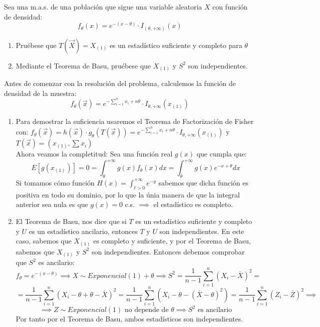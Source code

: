 \begin{problem}{2.4}
	Sea una m.a.s. de una población que sigue una variable aleatoria $X$ con función de densidad: 
	$$f_{\theta}(x) = e^{-(x - \theta)} \cdot I_{(\theta, +\infty)}(x)$$
	\begin{enumerate}
		\item Pruébese que $T(\vec{X}) = X_{(1)}$ es un estadístico suficiente y completo para $\theta$
		\item Mediante el Teorema de Basu, pruébese que $X_{(1)}$ y $S^2$ son independientes. 
	\end{enumerate} 
\end{problem}
\begin{sol}
	Antes de comenzar con la resolución del problema, calculemos la función de densidad de la muestra: 
	$$f_{\theta}(\vec{x}) = e^{-\sum_{i = 1}^{n}x_i + n\theta} \cdot I_{\theta, +\infty}(x_{(1)})$$
	\begin{enumerate}
		\item Para demostrar la suficiencia usaremos el Teorema de Factorización de Fisher con: $f_{\theta}(\vec{x}) = h(\vec{x}) \cdot g_{\theta}(T(\vec{x})) = e^{-\sum_{i = 1}^{n}x_i + n\theta} \cdot I_{\theta, +\infty}(x_{(1)})$ y $T(\vec{x}) = (x_{(1)}, \sum x_i)$\\
		Ahora veamos la completitud: Sea una función real $g(x)$ que cumpla que: $$E[g(x_{(1)})] = 0 = \int_{\theta}^{+\infty}g(x)f_{\theta}(x)dx = \int_{\theta}^{+\infty}g(x)e^{-x + \theta}dx$$
		Si tomamos cómo función $H(x) = \int_{t > 0}^{+\infty} e^{-y}$ sabemos que dicha función es positiva en todo su dominio, por lo que la únia manera de que la integral anterior sea nula es que $g(x) = 0$ c.s. $\implies$ el estadístico es completo.
		\item El Teorema de Basu, nos dice que si $T$ es un estadístico suficiente y completo y $U$ es un estadístico ancilario, entonces $T$ y $U$ son independientes. En este caso, sabemos que $X_{(1)}$ es completo y suficiente, y por el Teorema de Basu, sabemos que $X_{(1)}$ y $S^2$ son independientes.
		Entonces debemos comprobar que $S^2$ es ancilario: 
		$$ f_{\theta} = e^{-(x - \theta)} \implies X \sim Exponencial(1) + \theta \implies S^2 = \frac{1}{n-1}\sum_{i = 1}^{n}(X_i - \bar{X})^2 =$$  $$= \frac{1}{n-1}\sum_{i = 1}^{n} (X_i - \theta + \theta - \bar{X})^2 = \frac{1}{n-1}\sum_{i = 1}^{n} (X_i - \theta - (\bar{X} - \theta)^2) = \frac{1}{n-1}\sum_{i = 1}^{n} (Z_i - \bar{Z})^2 \implies $$ $$\implies Z \sim Exponencial(1) \text{ no depende de } \theta \implies S^2 \text{ es ancilario}$$
		Por tanto por el Teorema de Basu, ambos estadísticos son independientes.
	\end{enumerate}
\end{sol}
